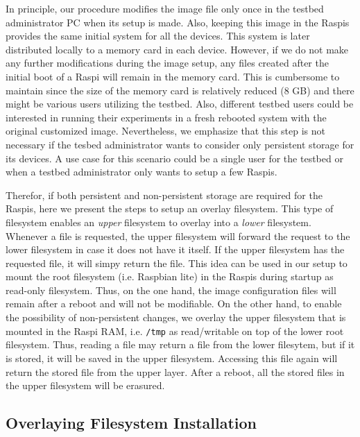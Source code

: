 \label{sec:overlay_fs}
In principle, our procedure modifies the image file only once in
the testbed administrator \ac{PC} when its setup is made. Also, keeping
this image in the \ac{Raspi}s provides the same initial system for all
the devices. This system is later distributed locally to a memory card
in each device. However, if we do not make any further modifications during
the image setup, any files created after the initial boot of a \ac{Raspi}
will remain in the memory card. This is cumbersome to maintain since
the size of the memory card is relatively reduced (8 GB) and there
might be various users utilizing the testbed. Also, different testbed
users could be interested in running their experiments in a fresh
rebooted system with the original customized image. Nevertheless, we
emphasize that this step is not necessary if the tesbed administrator
wants to consider only persistent storage for its devices. A use case
for this scenario could be a single user for the testbed or when a testbed
administrator only wants to setup a few \ac{Raspi}s.

Therefor, if both persistent and non-persistent storage are required for
the \ac{Raspi}s, here we present the steps to setup an overlay filesystem.
This type of filesystem enables an \textit{upper} filesystem to overlay
into a \textit{lower} filesystem. Whenever a file is requested, the upper
filesystem will forward the request to the lower filesystem in case it
does not have it itself. If the upper filesystem has the requested file,
it will simpy return the file. This idea can be used in our setup to mount
the root filesystem (i.e. Raspbian lite) in the \ac{Raspi}s during startup
as read-only filesystem. Thus, on the one hand, the image configuration files
will remain after a reboot and will not be modifiable. On the other hand,
to enable the possibility of non-persistent changes, we overlay the upper
filesystem that is mounted in the \ac{Raspi} \ac{RAM}, i.e. \texttt{/tmp}
as read/writable on top of the lower root filesystem. Thus, reading a file
may return a file from the lower filesytem, but if it is stored, it will
be saved in the upper filesystem. Accessing this file again will return
the stored file from the upper layer. After a reboot, all the stored files
in the upper filesystem will be erasured.

\subsection{Overlaying Filesystem Installation}


